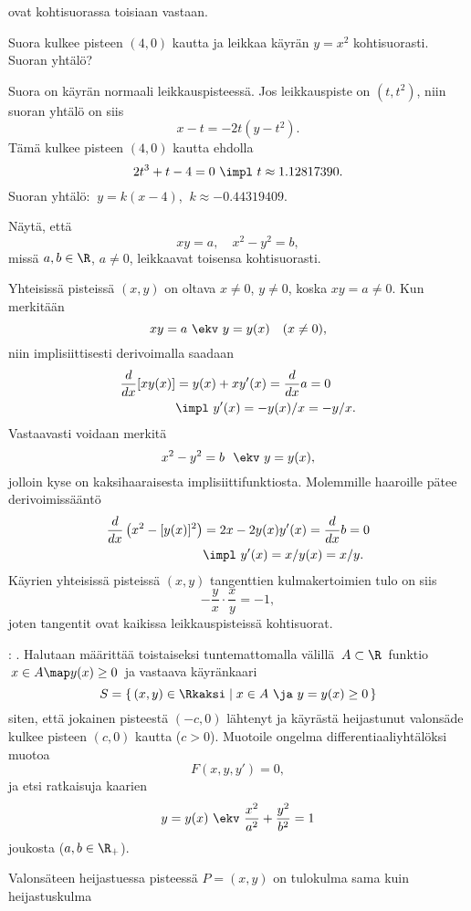ovat kohtisuorassa toisiaan vastaan.
\begin{Exa}
Suora kulkee pisteen $(4,0)$ kautta ja leikkaa käyrän $y=x^2$ kohtisuorasti. Suoran yhtälö?
\end{Exa}
\ratk Suora on käyrän normaali leikkauspisteessä. Jos leikkauspiste on $(t,t^2)$, niin suoran 
yhtälö on siis
\[
x-t=-2t(y-t^2).
\]
Tämä kulkee pisteen $(4,0)$ kautta ehdolla
\[
2t^3+t-4=0 \ \impl \ t\approx 1.12817390.
\]
Suoran yhtälö: $\ y=k(x-4)$, $\ k\approx -0.44319409$. \loppu
\begin{Exa} \label{kohtisuora leikkaus} 
Näytä, että  
\[
xy=a,\quad x^2-y^2=b,
\]
missä $a,b\in\R$, $a\neq 0$, leikkaavat toisensa kohtisuorasti.
\end{Exa}
\ratk Yhteisissä pisteissä $(x,y)$ on oltava $x\neq 0$, $y\neq 0$, koska $xy=a\neq 0$. Kun 
merkitään
\[
xy=a \ \ekv \ y=y(x)\quad (x\neq 0),
\]
niin implisiittisesti derivoimalla saadaan
\begin{align*}
\frac{d}{dx}[xy(x)]&=y(x)+xy'(x)=\frac{d}{dx}a=0 \\
&\impl \ y'(x)=-y(x)/x=-y/x.
\end{align*}
Vastaavasti voidaan merkitä
\[
x^2-y^2=b \ \ekv \ y=y(x),
\]
jolloin kyse on kaksihaaraisesta implisiittifunktiosta. Molemmille haaroille pätee 
derivoimissääntö
\begin{align*}
\frac{d}{dx}\left(x^2-[y(x)]^2\right)&= 2x-2y(x)y'(x)=\frac{d}{dx}b=0 \\
&\impl \ y'(x)=x/y(x)=x/y.
\end{align*}
Käyrien yhteisissä pisteissä $(x,y)$ tangenttien kulmakertoimien tulo on siis 
\[
-\frac{y}{x}\cdot\frac{x}{y} = -1,
\]
joten tangentit ovat kaikissa leikkauspisteissä kohtisuorat. \loppu
{}%
\begin{Exa}: . Halutaan määrittää toistaiseksi tuntemattomalla välillä
$\,A\subset\R\,$ funktio $\,x \in A \map y(x) \ge 0\,$ ja vastaava käyränkaari
\[
S = \{\,(x,y) \in \Rkaksi \mid x \in A\ \ja\ y = y(x) \ge 0\,\}
\]
siten, että jokainen pisteestä $(-c,0)$ lähtenyt ja käyrästä heijastunut valonsäde kulkee
pisteen $(c,0)$ kautta ($c>0$). Muotoile ongelma differentiaaliyhtälöksi muotoa
\[ 
F(x,y,y') = 0, 
\]
%
ja etsi ratkaisuja  kaarien
\[
y=y(x) \ \ekv \ \frac{x^2}{a^2}+\frac{y^2}{b^2}=1
\]
joukosta ($a,b\in\R_+$).
\end{Exa}
\ratk Valonsäteen heijastuessa pisteessä $P=(x,y)$ on tulokulma sama kuin heijastuskulma
